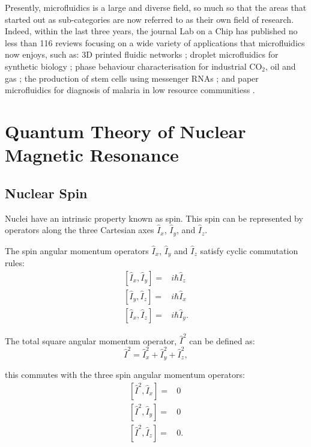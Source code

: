 Presently, microfluidics is a large and diverse field, so much so that the areas that started out as sub-categories are now referred to as their
own field of research. Indeed, within the last three years, the journal Lab on a Chip has published no less than 116 reviews focusing on a wide variety of applications
that microfluidics now enjoys, such as: 3D printed fluidic networks \citep{kinstlinger20163d}; droplet microfluidics for synthetic biology \citep{gach2017droplet};
phase behaviour characterisation for industrial CO$_2$, oil and gas \citep{bao2017microfluidic}; the production of stem cells using messenger RNAs \citep{giulitti2019direct};
and paper microfluidics for diagnosis of malaria in low resource communitiess \citep{reboud2019based}.

\newpage

\section{Quantum Theory of Nuclear Magnetic Resonance}\label{Quantum}

\subsection{Nuclear Spin}\label{Spin}

Nuclei have an intrinsic property known as spin. This spin can be represented by operators
along the three Cartesian axes $\hat{I}_x$, $\hat{I}_y$, and $\hat{I}_z$.

The spin angular momentum operators $\hat{I}_x$, $\hat{I}_y$ and $\hat{I}_z$
satisfy cyclic commutation rules:
\begin{align}\label{eqn:commutator}
  [\hat{I}_x,\hat{I}_y] =& i\hbar\hat{I}_z\\
  [\hat{I}_y,\hat{I}_z] =& i\hbar\hat{I}_x\\
  [\hat{I}_x,\hat{I}_z] =& i\hbar\hat{I}_y.
\end{align}


The total square angular momentum operator, $\hat{I}^2$ can be defined as:
\begin{equation}
  \hat{I}^2 = \hat{I}_x^2 + \hat{I}_y^2 + \hat{I}_z^2,
\end{equation}

this commutes with the three spin angular momentum operators:
\begin{align}\label{eqn:I2commute}
  [\hat{I}^2,\hat{I}_x] =& 0\\
  [\hat{I}^2,\hat{I}_y] =& 0\\
  [\hat{I}^2,\hat{I}_z] =& 0.
\end{align}

